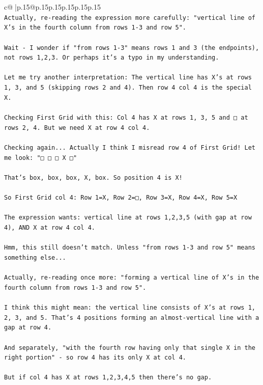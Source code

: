\documentclass{article}
\begin{document}
{\begin{supertabular}{c@{$\;$}|p{.15\linewidth}@{}p{.15\linewidth}p{.15\linewidth}p{.15\linewidth}p{.15\linewidth}p{.15\linewidth}}
{{{\\ 
\texttt{Actually, re{-}reading the expression more carefully: "vertical line of X's in the fourth column from rows 1{-}3 and row 5". } \\
\\ 
\texttt{Wait {-} I wonder if "from rows 1{-}3" means rows 1 and 3 (the endpoints), not rows 1,2,3. Or perhaps it's a typo in my understanding.} \\
\\ 
\texttt{Let me try another interpretation: The vertical line has X's at rows 1, 3, and 5 (skipping rows 2 and 4). Then row 4 col 4 is the special X.} \\
\\ 
\texttt{Checking First Grid with this: Col 4 has X at rows 1, 3, 5 and □ at rows 2, 4. But we need X at row 4 col 4.} \\
\\ 
\texttt{Checking again... Actually I think I misread row 4 of First Grid! Let me look: "□ □ □ X □"} \\
\\ 
\texttt{That's box, box, box, X, box. So position 4 is X! } \\
\\ 
\texttt{So First Grid col 4: Row 1=X, Row 2=□, Row 3=X, Row 4=X, Row 5=X} \\
\\ 
\texttt{The expression wants: vertical line at rows 1,2,3,5 (with gap at row 4), AND X at row 4 col 4.} \\
\\ 
\texttt{Hmm, this still doesn't match. Unless "from rows 1{-}3 and row 5" means something else...} \\
\\ 
\texttt{Actually, re{-}reading once more: "forming a vertical line of X's in the fourth column from rows 1{-}3 and row 5". } \\
\\ 
\texttt{I think this might mean: the vertical line consists of X's at rows 1, 2, 3, and 5. That's 4 positions forming an almost{-}vertical line with a gap at row 4.} \\
\\ 
\texttt{And separately, "with the fourth row having only that single X in the right portion" {-} so row 4 has its only X at col 4.} \\
\\ 
\texttt{But if col 4 has X at rows 1,2,3,4,5 then there's no gap.} \\
}}}
\end{supertabular}}
\end{document}

